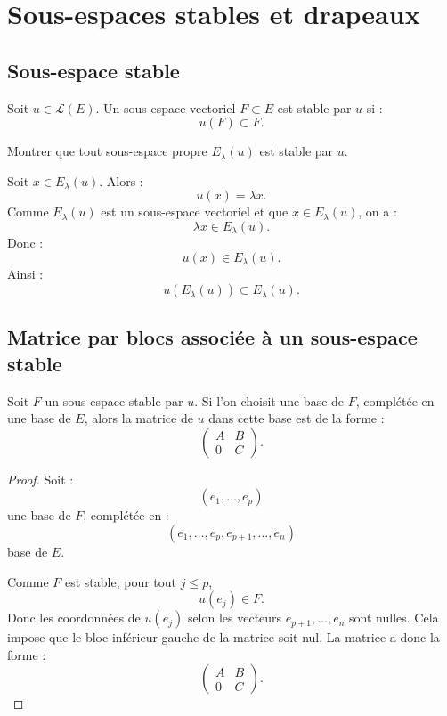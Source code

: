 \documentclass[11pt,a4paper]{article}
\newcommand{\Lcal}{\mathcal L}
\begin{document}
\section{Sous-espaces stables et drapeaux}

\subsection{Sous-espace stable}

\begin{definitionbox}
Soit \(u\in\Lcal(E)\).  
Un sous-espace vectoriel \(F\subset E\) est stable par \(u\) si :
\[
u(F)\subset F.
\]
\end{definitionbox}

\begin{exercicebox}
Montrer que tout sous-espace propre \(E_\lambda(u)\) est stable par \(u\).
\end{exercicebox}

\begin{correctionbox}
Soit \(x\in E_\lambda(u)\).  
Alors :
\[
u(x)=\lambda x.
\]
Comme \(E_\lambda(u)\) est un sous-espace vectoriel et que \(x\in E_\lambda(u)\), on a :
\[
\lambda x\in E_\lambda(u).
\]
Donc :
\[
u(x)\in E_\lambda(u).
\]
Ainsi :
\[
u(E_\lambda(u))\subset E_\lambda(u).
\]
\end{correctionbox}

\subsection{Matrice par blocs associée à un sous-espace stable}

\begin{theorembox}
Soit \(F\) un sous-espace stable par \(u\).  
Si l'on choisit une base de \(F\), complétée en une base de \(E\), alors la matrice de \(u\) dans cette base est de la forme :
\[
\begin{pmatrix}
A&B\\
0&C
\end{pmatrix}.
\]
\end{theorembox}

\begin{proof}
Soit :
\[
(e_1,\dots,e_p)
\]
une base de \(F\), complétée en :
\[
(e_1,\dots,e_p,e_{p+1},\dots,e_n)
\]
base de \(E\).

Comme \(F\) est stable, pour tout \(j\leq p\),
\[
u(e_j)\in F.
\]
Donc les coordonnées de \(u(e_j)\) selon les vecteurs \(e_{p+1},\dots,e_n\) sont nulles.  
Cela impose que le bloc inférieur gauche de la matrice soit nul.  
La matrice a donc la forme :
\[
\begin{pmatrix}
A&B\\
0&C
\end{pmatrix}.
\]
\end{proof}
\end{document}
